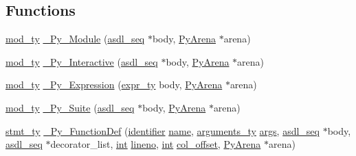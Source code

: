 \subsection*{Functions}
\begin{DoxyCompactItemize}
\item 
\mbox{\hyperlink{_python-ast_8h_ac5ca223bf2573144610f74dc91fc431e}{mod\+\_\+ty}} \mbox{\hyperlink{_python-ast_8h_ac22a9146d597c59e94e9511dd4db4772}{\+\_\+\+Py\+\_\+\+Module}} (\mbox{\hyperlink{structasdl__seq}{asdl\+\_\+seq}} $\ast$body, \mbox{\hyperlink{pyarena_8h_a9edeb357fbb27333471022a0975adb7a}{Py\+Arena}} $\ast$arena)
\item 
\mbox{\hyperlink{_python-ast_8h_ac5ca223bf2573144610f74dc91fc431e}{mod\+\_\+ty}} \mbox{\hyperlink{_python-ast_8h_a8e15d080424e133f37dcc31ddd99a34b}{\+\_\+\+Py\+\_\+\+Interactive}} (\mbox{\hyperlink{structasdl__seq}{asdl\+\_\+seq}} $\ast$body, \mbox{\hyperlink{pyarena_8h_a9edeb357fbb27333471022a0975adb7a}{Py\+Arena}} $\ast$arena)
\item 
\mbox{\hyperlink{_python-ast_8h_ac5ca223bf2573144610f74dc91fc431e}{mod\+\_\+ty}} \mbox{\hyperlink{_python-ast_8h_a87521a69a46a2f948409cfc6e4a8e8cf}{\+\_\+\+Py\+\_\+\+Expression}} (\mbox{\hyperlink{_python-ast_8h_a56d3705e020a071405094a220c4592bd}{expr\+\_\+ty}} body, \mbox{\hyperlink{pyarena_8h_a9edeb357fbb27333471022a0975adb7a}{Py\+Arena}} $\ast$arena)
\item 
\mbox{\hyperlink{_python-ast_8h_ac5ca223bf2573144610f74dc91fc431e}{mod\+\_\+ty}} \mbox{\hyperlink{_python-ast_8h_a7a0cc82ce7beb48bc2e9811f63ce1d9f}{\+\_\+\+Py\+\_\+\+Suite}} (\mbox{\hyperlink{structasdl__seq}{asdl\+\_\+seq}} $\ast$body, \mbox{\hyperlink{pyarena_8h_a9edeb357fbb27333471022a0975adb7a}{Py\+Arena}} $\ast$arena)
\item 
\mbox{\hyperlink{_python-ast_8h_a39618071027b661bc03e8916e664e1a7}{stmt\+\_\+ty}} \mbox{\hyperlink{_python-ast_8h_adf3e1a9736a5443058274bcd750304fb}{\+\_\+\+Py\+\_\+\+Function\+Def}} (\mbox{\hyperlink{asdl_8h_a78ca2081e230a95abc88c411c9816775}{identifier}} \mbox{\hyperlink{structname}{name}}, \mbox{\hyperlink{_python-ast_8h_a45cc6e94d598fdc335d8c85739108a3e}{arguments\+\_\+ty}} \mbox{\hyperlink{classargs}{args}}, \mbox{\hyperlink{structasdl__seq}{asdl\+\_\+seq}} $\ast$body, \mbox{\hyperlink{structasdl__seq}{asdl\+\_\+seq}} $\ast$decorator\+\_\+list, \mbox{\hyperlink{warnings_8h_a74f207b5aa4ba51c3a2ad59b219a423b}{int}} \mbox{\hyperlink{pyerrors_8h_a501b314f49b3a9ff6e7be599d94686ee}{lineno}}, \mbox{\hyperlink{warnings_8h_a74f207b5aa4ba51c3a2ad59b219a423b}{int}} \mbox{\hyperlink{node_8h_ae2ed0efcc01d73248ef2b41134cfc7a1}{col\+\_\+offset}}, \mbox{\hyperlink{pyarena_8h_a9edeb357fbb27333471022a0975adb7a}{Py\+Arena}} $\ast$arena)

\end{DoxyCompactItemize}
